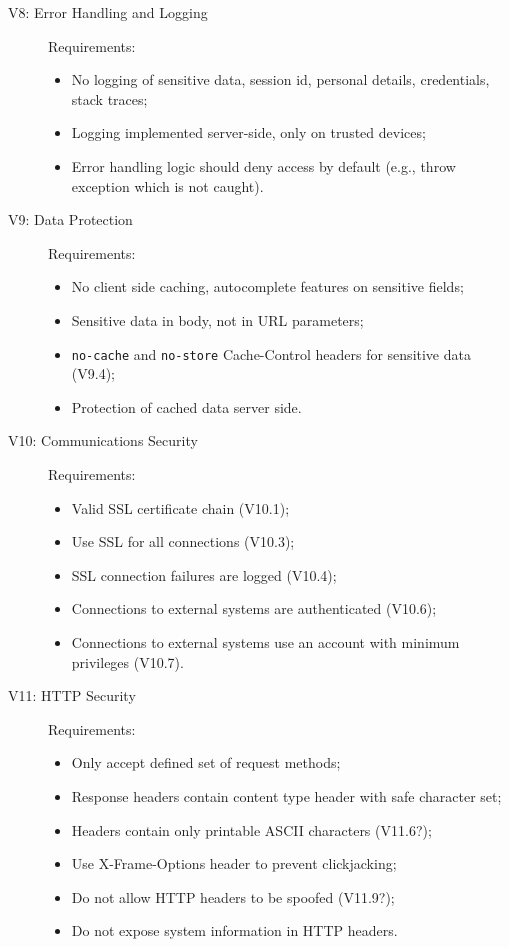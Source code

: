 \documentclass[a4paper]{report}
\begin{document}
\begin{description}
\item[V8: Error Handling and Logging] Requirements:
\begin{itemize}
\item No logging of sensitive data, session id, personal details, credentials, stack traces;
\item Logging implemented server-side, only on trusted devices;
\item Error handling logic should deny access by default (e.g., throw exception which is not caught).
\end{itemize}

\item[V9: Data Protection] Requirements:
\begin{itemize}
\item No client side caching, autocomplete features on sensitive fields;
\item Sensitive data in body, not in URL parameters;
\item \texttt{no-cache} and \texttt{no-store} Cache-Control headers for sensitive data (V9.4);
\item Protection of cached data server side.
\end{itemize}

\item[V10: Communications Security] Requirements:
\begin{itemize}
\item Valid SSL certificate chain (V10.1);
\item Use SSL for all connections (V10.3);
\item SSL connection failures are logged (V10.4);
\item Connections to external systems are authenticated (V10.6);
\item Connections to external systems use an account with minimum privileges (V10.7).
\end{itemize}

\item[V11: HTTP Security] Requirements:
\begin{itemize}
\item Only accept defined set of request methods;
\item Response headers contain content type header with safe character set;
\item Headers contain only printable ASCII characters (V11.6?);
\item Use X-Frame-Options header to prevent clickjacking;
\item Do not allow HTTP headers to be spoofed (V11.9?);
\item Do not expose system information in HTTP headers.
\end{itemize}


\end{description}
\end{document}
